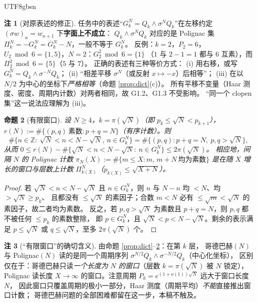 \documentclass[11pt,a4paper]{article}
\newcommand{\status}[1]{\par\noindent\fbox{\textbf{状态：#1}}\par\smallskip}
\theoremstyle{plain}
\newtheorem{prop}{命题}[section]
\theoremstyle{definition}
\newtheorem{rem}[prop]{注}
\begin{document}
\begin{CJK}{UTF8}{gbsn}
\begin{rem}[对原表述的修正]\label{rem:direction}
任务中的表述“$G_k^N=Q_k\wedge\sigma^NQ_k$”在左移约定 $(\sigma w)_n=w_{n+1}$ 下\textbf{字面上不成立}：
$Q_k\wedge\sigma^NQ_k$ 对应的是 Polignac 集 $\Pi_k^N=-G_k^N=G_k^N-N$，一般不等于 $G_k^N$。
反例：$k=2$，$P_2=6$，$U_2\bmod 6=\{1,5\}$，$N=2$：$G_2^2\bmod6=\{1\}$
（$1$ 与 $2-1=1$ 都与 $6$ 互素），而 $\Pi_2^2\bmod 6=\{5\}$（$5$ 与 $7$）。
正确的表述有三种等价方式：
(i) 用右移，或写 $G_k^N=Q_k\wedge\sigma^{-N}Q_k$；
(ii) “相差平移 $\sigma^N$（或反射 $x\mapsto -x$）后相等”；
(iii) 在以 $N/2$ 为中心的坐标下\emph{严格相等}（命题 \ref{prop:dict}(c)）。
所有平移不变量（Haar 测度、密度、周期内计数）对两者相同，故 G1.2、G1.3 不受影响。
“同一个 clopen 集”这一说法应理解为 (iii)。
\end{rem}

\begin{prop}[有限窗口]\label{prop:window}
设 $N\ge4$，$k=\pi(\sqrt N)$（即 $p_k\le\sqrt N<p_{k+1}$），
$r(N):=\#\{(p,q)\ \text{素数}: p+q=N\}$（有序计数）。则
\[
\#\{n\in\mathbb Z:\ \sqrt N<n<N-\sqrt N,\ n\in G_k^N\}
=\#\{(p,q):p+q=N,\ p,q>\sqrt N\},
\]
从而 $0\le r(N)-\#\{\sqrt N<n<N-\sqrt N:\ n\in G_k^N\}\le 2\pi(\sqrt N)$。
相应地，间隔 $N$ 的 Polignac 计数
$\pi_N(X):=\#\{m\le X: m,\,m+N\ \text{均为素数}\}$ 是在\emph{随 $X$ 增长的}窗口与层数上计数
$\Pi_{k(X)}^N$（$p_{k(X)}\le\sqrt{X+N}$）。
\end{prop}
\status{已证}
\begin{proof}
若 $\sqrt N<n<N-\sqrt N$ 且 $n\in G_k^N$，则 $n$ 与 $N-n$ 均 $<N$、均 $>\sqrt N\ge p_k$、
且都没有 $\le\sqrt N$ 的素因子；合数 $m<N$ 必有 $\le\sqrt m<\sqrt N$ 的素因子，故二者均为素数。
反之，若 $p,q>\sqrt N$ 为素数且 $p+q=N$，则 $p,q$ 都不被任何 $\le p_k$ 的素数整除，
即 $p\in G_k^N$，且 $\sqrt N<p<N-\sqrt N$。剩余的表示满足 $p\le\sqrt N$ 或 $q\le\sqrt N$，至多 $2\pi(\sqrt N)$ 个。
\end{proof}

\begin{rem}[“有限窗口”的确切含义]
由命题 \ref{prop:dict}--\ref{prop:window}：在第 $k$ 层，
哥德巴赫$(N)$ 与 Polignac$(N)$ 读的是同一个周期序列
$\sigma^{N/2}Q_k\wedge\sigma^{-N/2}Q_k$（中心化坐标），
区别仅在于：哥德巴赫只读\emph{一个长度为 $N$ 的窗口}（层数 $k=\pi(\sqrt N)$ 被 $N$ 锁定），
Polignac 读长度 $X\to\infty$ 的窗口。注意周期 $P_k=e^{(1+o(1))\sqrt N}$ 远大于窗口长度 $N$，
因此窗口只覆盖周期的极小一部分，Haar 测度（周期平均）\emph{不能}直接推出窗口计数；
哥德巴赫问题的全部困难都留在这一步，本稿不触及。
\end{rem}


\end{CJK}
\end{document}
